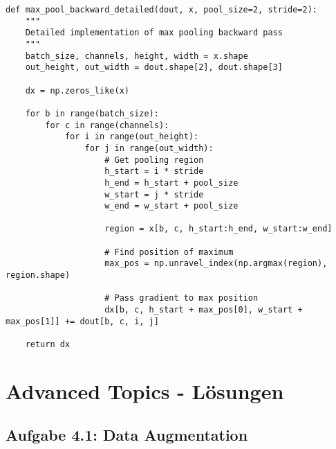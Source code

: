 ﻿\documentclass[12pt,a4paper]{article}
\begin{document}
\begin{lstlisting}
def max_pool_backward_detailed(dout, x, pool_size=2, stride=2):
    """
    Detailed implementation of max pooling backward pass
    """
    batch_size, channels, height, width = x.shape
    out_height, out_width = dout.shape[2], dout.shape[3]
    
    dx = np.zeros_like(x)
    
    for b in range(batch_size):
        for c in range(channels):
            for i in range(out_height):
                for j in range(out_width):
                    # Get pooling region
                    h_start = i * stride
                    h_end = h_start + pool_size
                    w_start = j * stride
                    w_end = w_start + pool_size
                    
                    region = x[b, c, h_start:h_end, w_start:w_end]
                    
                    # Find position of maximum
                    max_pos = np.unravel_index(np.argmax(region), region.shape)
                    
                    # Pass gradient to max position
                    dx[b, c, h_start + max_pos[0], w_start + max_pos[1]] += dout[b, c, i, j]
    
    return dx
\end{lstlisting}

\section{Advanced Topics - Lösungen}

\subsection{Aufgabe 4.1: Data Augmentation}
\end{document}
